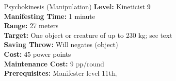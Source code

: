 {Psychokinesis (Manipulation)}
{
	\textbf{Level:}
	Kineticist 9\\
	\textbf{Manifesting Time:}
	1 minute\\
	\textbf{Range:}
	27 meters\\
	\textbf{Target:}
	One object or creature of up to 230 kg; see text\\
	\textbf{Saving Throw:}
	Will negates (object)\\
	\textbf{Cost:}
	45 power points\\
	\textbf{Maintenance Cost:}
	9 pp/round\\
	\textbf{Prerequisites:}
	Manifester level 11th, \\
}
